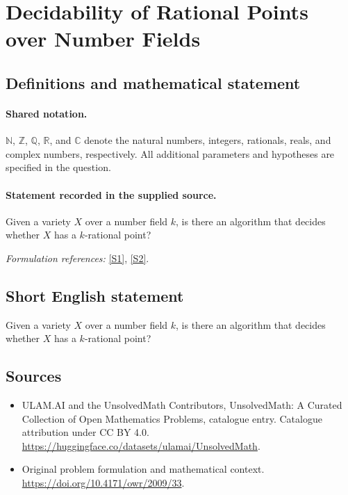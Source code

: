 \documentclass[11pt]{article}
\newcommand{\sref}[2]{\hyperlink{source:#1:#2}{[S#2]}}
\begin{document}
\section{Decidability of Rational Points over Number Fields}\label{statement}

\subsection{Definitions and mathematical statement}

\paragraph{Shared notation.}$\mathbb N$, $\mathbb Z$, $\mathbb Q$, $\mathbb R$, and $\mathbb C$ denote the natural numbers, integers, rationals, reals, and complex numbers, respectively. All additional parameters and hypotheses are specified in the question.


\paragraph{Statement recorded in the supplied source.}
Given a variety $X$ over a number field $k$, is there an algorithm that decides whether $X$ has a $k$-rational point?
\par\smallskip\textit{Formulation references:} \sref{statement}{1}, \sref{statement}{2}.
\subsection{Short English statement}
Given a variety $X$ over a number field $k$, is there an algorithm that decides whether $X$ has a $k$-rational point?
\subsection{Sources}
\begin{itemize}
\item[\hypertarget{source:statement:1}{S1}] ULAM.AI and the UnsolvedMath Contributors, UnsolvedMath: A Curated Collection of Open Mathematics Problems, catalogue entry. Catalogue attribution under CC BY 4.0.
\url{https://huggingface.co/datasets/ulamai/UnsolvedMath}.
\item[\hypertarget{source:statement:2}{S2}] Original problem formulation and mathematical context.
\url{https://doi.org/10.4171/owr/2009/33}.
\end{itemize}
\label{end:statement}
\end{document}
